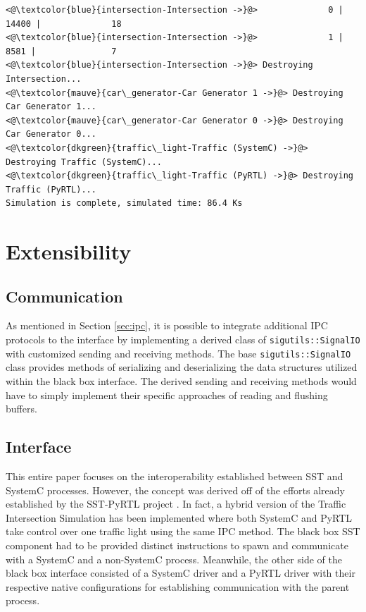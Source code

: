 \documentclass{article}
\begin{document}
\begin{lstlisting}[caption={Sample Simulation Output}, captionpos=b]
<@\textcolor{blue}{intersection-Intersection ->}@>              0 |       14400 |              18
<@\textcolor{blue}{intersection-Intersection ->}@>              1 |        8581 |               7
<@\textcolor{blue}{intersection-Intersection ->}@> Destroying Intersection...
<@\textcolor{mauve}{car\_generator-Car Generator 1 ->}@> Destroying Car Generator 1...
<@\textcolor{mauve}{car\_generator-Car Generator 0 ->}@> Destroying Car Generator 0...
<@\textcolor{dkgreen}{traffic\_light-Traffic (SystemC) ->}@> Destroying Traffic (SystemC)...
<@\textcolor{dkgreen}{traffic\_light-Traffic (PyRTL) ->}@> Destroying Traffic (PyRTL)...
Simulation is complete, simulated time: 86.4 Ks
\end{lstlisting}
\fi
  \section{Extensibility}

    \subsection{Communication}
    As mentioned in Section \ref{sec:ipc}, it is possible to integrate additional IPC protocols to
    the interface by implementing a derived class of \lstinline{sigutils::SignalIO} with customized
    sending and receiving methods. The base \lstinline{sigutils::SignalIO} class provides methods of
    serializing and deserializing the data structures utilized within the black box interface. The
    derived sending and receiving methods would have to simply implement their specific approaches
    of reading and flushing buffers.

    \subsection{Interface}

    This entire paper focuses on the interoperability established between SST and SystemC processes.
    However, the concept was derived off of the efforts already established by the SST-PyRTL project
    \cite{pyrtl-sst}. In fact, a hybrid version of the Traffic Intersection Simulation has been
    implemented where both SystemC and PyRTL take control over one traffic light using the same IPC
    method. The black box SST component had to be provided distinct instructions to spawn and
    communicate with a SystemC and a non-SystemC process. Meanwhile, the other side of the black box
    interface consisted of a SystemC driver and a PyRTL driver with their respective native
    configurations for establishing communication with the parent process.
\end{document}
